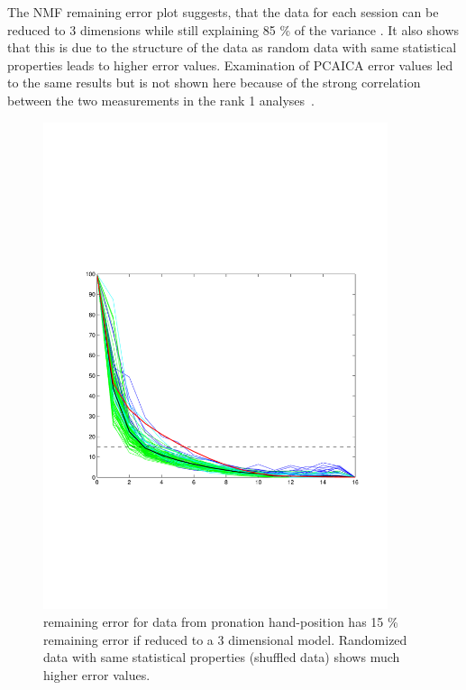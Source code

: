 The NMF remaining error plot suggests, that the data for each session can be reduced to 3 dimensions while still explaining 85 \% of the variance . It also shows that this is due to the structure of the data as random data with same statistical properties leads to higher error values. Examination of PCAICA error values led to the same results but is not shown here because of the strong correlation between the two measurements in the rank 1 analyses~.
\begin{figure}[ht]
	\centering
		\includegraphics[width=0.9\textwidth]{images/resid_test.pdf}
	\caption
	{
	remaining error for data from pronation hand-position has 15 \% remaining error if reduced to a 3 dimensional model. Randomized data with same statistical properties (shuffled data) shows much higher error values.
	}
	\label{sg:fig:images_all_resid_non}
\end{figure}

